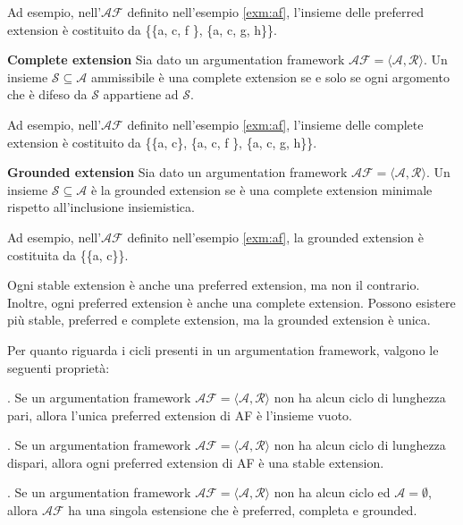 Ad esempio, nell'$\mathcal{AF}$ definito nell'esempio \ref{exm:af}, l'insieme delle preferred extension è costituito da \{\{a, c, f \}, \{a, c, g, h\}\}.

\bigskip
\begin{defn} \textbf{Complete extension} Sia dato un argumentation framework $\mathcal{AF = ⟨A, R⟩}$. Un insieme $\mathcal{S ⊆ A}$ ammissibile è una complete extension se e solo se ogni argomento che è difeso da $\mathcal{S}$ appartiene ad $\mathcal{S}$.
\end{defn}

Ad esempio, nell'$\mathcal{AF}$ definito nell'esempio \ref{exm:af}, l'insieme delle complete extension è costituito da \{\{a, c\}, \{a, c, f \}, \{a, c, g, h\}\}.

\bigskip
\begin{defn} \textbf{Grounded extension} Sia dato un argumentation framework $\mathcal{AF = ⟨A, R⟩}$. Un insieme $\mathcal{S ⊆ A}$ è la grounded extension se è una complete extension minimale rispetto all'inclusione insiemistica.
\end{defn}

Ad esempio, nell'$\mathcal{AF}$ definito nell'esempio \ref{exm:af}, la grounded extension è costituita da \{\{a, c\}\}.

\bigskip
\begin{prp}Ogni stable extension è anche una preferred extension, ma non il contrario. Inoltre, ogni preferred extension è anche una complete extension. Possono esistere più stable, preferred e complete extension, ma la grounded extension è unica.
\end{prp}

Per quanto riguarda i cicli presenti in un argumentation framework, valgono le seguenti proprietà:

\bigskip
\begin{prp}. Se un argumentation framework $\mathcal{AF = ⟨A,R⟩}$ non ha alcun ciclo di lunghezza pari, allora l’unica preferred extension di AF è l’insieme vuoto.
\end{prp}

\bigskip
\begin{prp}. Se un argumentation framework $\mathcal{AF = ⟨A,R⟩}$ non ha alcun ciclo di lunghezza dispari, allora ogni preferred extension di AF è una stable extension.
\end{prp}

\bigskip
\begin{prp}. Se un argumentation framework $\mathcal{AF = ⟨A,R⟩}$ non ha alcun ciclo ed $\mathcal{A = ∅}$, allora $\mathcal{AF}$ ha una singola estensione che è preferred, completa e grounded.
\end{prp}


